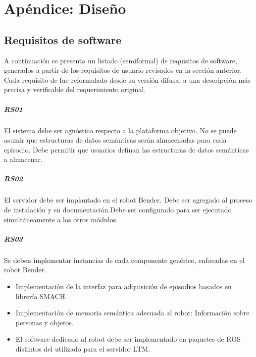 \chapter{Apéndice: Diseño}\label{chapter:appendix_a}

\section{Requisitos de software}

A continuación se presenta un listado (semiformal) de requisitos de software, generados a partir de los requisitos de usuario revisados en la sección anterior. Cada requisito de fue reformulado desde su versión difusa, a una descripción más precisa y verificable del requerimiento original. 

\paragraph{RS01}
El sistema debe ser agnóstico respecto a la plataforma objetivo. No se puede asumir que estructuras de datos semánticas serán almacenadas para cada episodio. Debe permitir que usuarios definan las estructuras de datos semánticas a almacenar.

\paragraph{RS02}
El servidor debe ser implantado en el robot Bender. Debe ser agregado al proceso de instalación y su documentación.Debe ser configurado para ser ejecutado simultáneamente a los otros módulos.

\paragraph{RS03}
Se deben implementar instancias de cada componente genérico, enfocadas en el robot Bender.
\begin{itemize}
	\item Implementación de la interfaz para adquisición de episodios basados en librería SMACH.
	\item Implementación de memoria semántica adecuada al robot: Información sobre personas y objetos.
	\item El software dedicado al robot debe ser implementado en paquetes de ROS distintos del utilizado para el servidor LTM.
\end{itemize}


